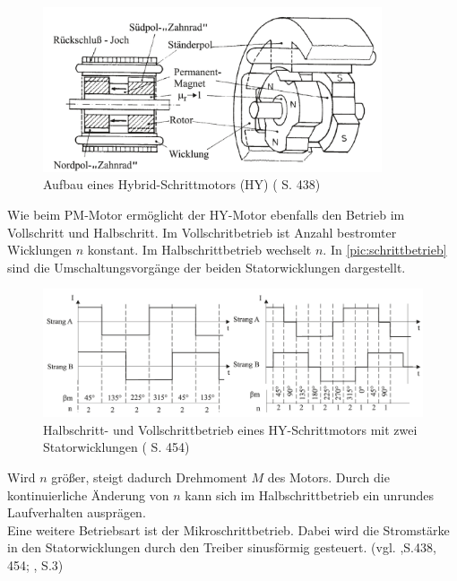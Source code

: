 \begin{figure}[h]
	\begin{center}
		\includegraphics[width=10cm]{hyMotor.png}
		\caption{Aufbau eines Hybrid-Schrittmotors (HY) (\cite{kleinantriebe} S. 438)}
		\label{pic:hyMotor}
	\end{center}
\end{figure}

\newpage
Wie beim PM-Motor ermöglicht der HY-Motor ebenfalls den Betrieb im Vollschritt und Halbschritt. Im Vollschritbetrieb ist Anzahl bestromter Wicklungen $n$ konstant. Im Halbschrittbetrieb wechselt $n$. In \autoref{pic:schrittbetrieb} sind die Umschaltungsvorgänge der beiden Statorwicklungen dargestellt. 

\begin{figure}[h]
	\begin{center}
		\includegraphics[width=16cm]{schrittbetrieb.png}
		\caption{Halbschritt- und Vollschrittbetrieb eines HY-Schrittmotors mit zwei Statorwicklungen (\cite{kleinantriebe} S. 454)}
		\label{pic:schrittbetrieb}
	\end{center}
\end{figure}


Wird $n$ größer, steigt dadurch Drehmoment $M$ des Motors. Durch die kontinuierliche Änderung von $n$ kann sich im Halbschrittbetrieb ein unrundes Laufverhalten ausprägen. \\
Eine weitere Betriebsart ist der Mikroschrittbetrieb. Dabei wird die Stromstärke in den Statorwicklungen durch den Treiber sinusförmig gesteuert. (vgl. \cite{kleinantriebe},S.438, 454; \cite{schrittmotorBa}, S.3)

